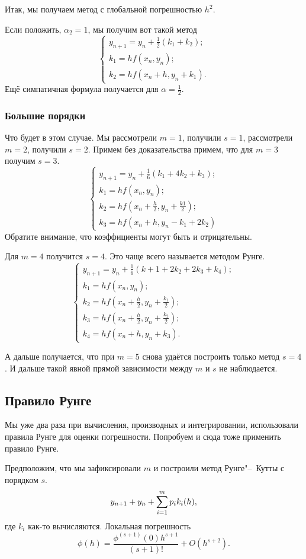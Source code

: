 Итак, мы получаем метод с глобальной погрешностью $h^2$.

Если положить, $\alpha_2=1$, мы получим вот такой метод
\[
  \begin{cases}
  y_{n+1} = y_n + \frac12(k_1 + k_2);\\
  k_1 = h f(x_n,y_n);\\
  k_2 = h f(x_n + h, y_n + k_1).
  \end{cases}
\]
Ещё симпатичная формула получается для $\alpha= \frac12$.
\subsubsection{Большие порядки}
Что будет в этом случае. Мы рассмотрели $m=1$, получили $s=1$, рассмотрели $m=2$, получили $s=2$. Примем без доказательства примем, что для $m=3$ получим $s=3$.
\[
  \begin{cases}
  y_{n+1} = y_n + \frac16 (k_1 + 4k_2+ k_3);\\
  k_1 = h f(x_n,y_n);\\
  k_2 = h f\left( x_n + \frac h2,y_n + \frac{k1}2  \right);\\
  k_3 = hf(x_n + h,y_n - k_1 + 2 k_2)
\end{cases}
\]
Обратите внимание, что коэффициенты могут быть и отрицательны.

Для $m=4$ получится $s=4$. Это чаще всего называется методом Рунге. 
\[
\begin{cases}
  y_{n+1} = y_n + \frac16 (k+1 + 2k_2 + 2k_3 + k_4);\\
  k_1 = h f(x_n,y_n);\\
  k_2 = h f\left( x_n + \frac h2,y_n + \frac{k_1}2 \right);\\
  k_3 = h f\left( x_n + \frac h2,y_n + \frac{k_2}2 \right);\\
  k_4 = h f\left( x_n + h, y_n + k_3 \right).
\end{cases}
\]

А дальше получается, что при $m=5$ снова удаётся построить только метод $s=4$. И дальше такой явной прямой зависимости между $m$ и $s$ не наблюдается.

\subsection{Правило Рунге}
Мы уже два раза при вычисления, производных и интегрировании, использовали правила Рунге для оценки погрешности. Попробуем и сюда тоже применить правило Рунге.

Предположим, что мы зафиксировали $m$ и построили метод Рунге"--~Кутты с порядком $s$.
\[
  y_{n+1} + y_n + \sum\limits_{i = 1}^{m} p_i k_i(h),
\]
где $k_i$ как-то вычисляются. Локальная погрешность
\[
  \phi(h) = \frac{\phi^{(s+1)}(0)h^{s+1}}{(s+1)!} + O(h^{s+2}).
\]

